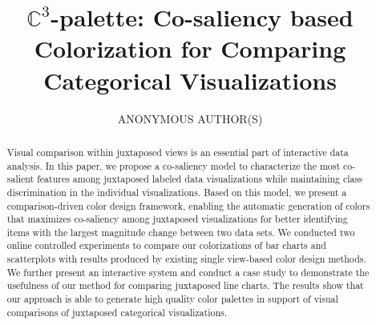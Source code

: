 \documentclass[manuscript,screen,review]{acmart}
\newcommand{\toolname}{$\mathbb{C}^3$}
\begin{document}
\graphicspath{{figures/}{pictures/}{images/}{./}} %
\title{\toolname-palette: Co-saliency based Colorization for Comparing Categorical Visualizations}
%
%
\author{ANONYMOUS AUTHOR(S)}
\renewcommand{\shortauthors}{Anon.}

\begin{abstract}
Visual comparison within juxtaposed views is an essential part of interactive data analysis. In this paper, we propose a co-saliency model to characterize the most co-salient features among juxtaposed labeled data visualizations while maintaining class discrimination in the individual visualizations.
Based on this model, we present a comparison-driven color design framework, enabling the automatic  generation of colors that maximizes co-saliency among juxtaposed visualizations for better identifying  items with the largest magnitude change between two data sets. We conducted two online controlled experiments to compare our colorizations of bar charts and scatterplots with results produced by existing single view-based color design methods. We further present an interactive system and conduct a case study to demonstrate the usefulness of our method for comparing juxtaposed line charts. The results show that our approach is able to generate high quality color palettes in support of visual comparisons of juxtaposed categorical visualizations.
\end{abstract}
\end{document}
